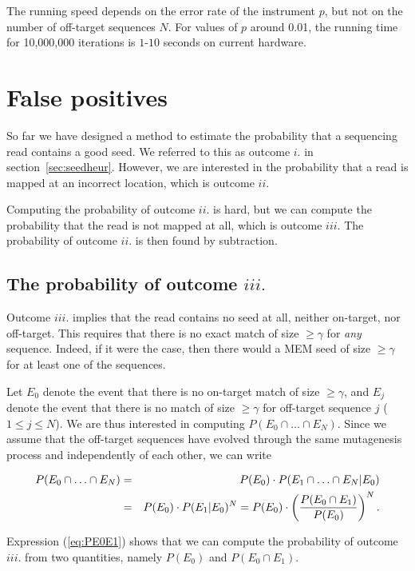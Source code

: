 \documentclass{article}
\begin{document}
The running speed depends on the error rate of the instrument $p$, but not
on the number of off-target sequences $N$. For values of $p$ around 0.01,
the running time for 10,000,000 iterations is $1$-$10$ seconds on current
hardware.

\section{False positives}

So far we have designed a method to estimate the probability that a
sequencing read contains a good seed. We referred to this as outcome $i.$
in section~\ref{sec:seedheur}. However, we are interested in the
probability that a read is mapped at an incorrect location, which is
outcome $ii.$

Computing the probability of outcome $ii.$ is hard, but we can compute the
probability that the read is not mapped at all, which is outcome $iii.$
The probability of outcome $ii.$ is then found by subtraction.

\subsection{The probability of outcome $iii.$}

Outcome $iii.$ implies that the read contains no seed at all, neither
on-target, nor off-target. This requires that there is no exact match of
size $\geq \gamma$ for \emph{any} sequence. Indeed, if it were the case,
then there would a MEM seed of size $\geq \gamma$ for at least one of the
sequences.

Let $E_0$ denote the event that there is no on-target match of size $\geq
\gamma$, and $E_j$ denote the event that there is no match of size $\geq
\gamma$ for off-target sequence $j$ ($1 \leq j \leq N$). We are thus
interested in computing $P(E_0 \cap \ldots \cap E_N)$. Since we assume
that the off-target sequences have evolved through the same mutagenesis
process and independently of each other, we can write

\begin{eqnarray}
\notag
P(E_0 \cap \ldots \cap E_N) &=&
  P(E_0) \cdot P(E_1 \cap \ldots \cap E_N | E_0) \\
\label{eq:PE0E1}
  &=& P(E_0) \cdot P(E_1 | E_0)^N =
  P(E_0) \cdot \left( \frac{P(E_0 \cap E_1)}{P(E_0)} \right)^N.
\end{eqnarray}

Expression (\ref{eq:PE0E1}) shows that we can compute the probability of
outcome $iii.$ from two quantities, namely $P(E_0)$ and $P(E_0 \cap E_1)$.
\end{document}
